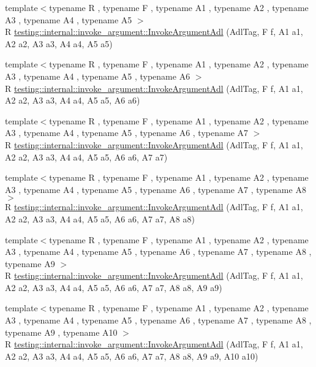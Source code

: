 \begin{DoxyCompactItemize}
\item 
{\footnotesize template$<$typename R , typename F , typename A1 , typename A2 , typename A3 , typename A4 , typename A5 $>$ }\\R \mbox{\hyperlink{namespacetesting_1_1internal_1_1invoke__argument_a371c08ae03d150520e8bda58fb4574c3}{testing\+::internal\+::invoke\+\_\+argument\+::\+Invoke\+Argument\+Adl}} (Adl\+Tag, F f, A1 a1, A2 a2, A3 a3, A4 a4, A5 a5)
\item 
{\footnotesize template$<$typename R , typename F , typename A1 , typename A2 , typename A3 , typename A4 , typename A5 , typename A6 $>$ }\\R \mbox{\hyperlink{namespacetesting_1_1internal_1_1invoke__argument_a16bf1b90d183210a82fbbef4e2eef1c5}{testing\+::internal\+::invoke\+\_\+argument\+::\+Invoke\+Argument\+Adl}} (Adl\+Tag, F f, A1 a1, A2 a2, A3 a3, A4 a4, A5 a5, A6 a6)
\item 
{\footnotesize template$<$typename R , typename F , typename A1 , typename A2 , typename A3 , typename A4 , typename A5 , typename A6 , typename A7 $>$ }\\R \mbox{\hyperlink{namespacetesting_1_1internal_1_1invoke__argument_a77f581ed8b270ed4752d49d5bdd59e84}{testing\+::internal\+::invoke\+\_\+argument\+::\+Invoke\+Argument\+Adl}} (Adl\+Tag, F f, A1 a1, A2 a2, A3 a3, A4 a4, A5 a5, A6 a6, A7 a7)
\item 
{\footnotesize template$<$typename R , typename F , typename A1 , typename A2 , typename A3 , typename A4 , typename A5 , typename A6 , typename A7 , typename A8 $>$ }\\R \mbox{\hyperlink{namespacetesting_1_1internal_1_1invoke__argument_a43c35b90896110940a0cc41c337ca306}{testing\+::internal\+::invoke\+\_\+argument\+::\+Invoke\+Argument\+Adl}} (Adl\+Tag, F f, A1 a1, A2 a2, A3 a3, A4 a4, A5 a5, A6 a6, A7 a7, A8 a8)
\item 
{\footnotesize template$<$typename R , typename F , typename A1 , typename A2 , typename A3 , typename A4 , typename A5 , typename A6 , typename A7 , typename A8 , typename A9 $>$ }\\R \mbox{\hyperlink{namespacetesting_1_1internal_1_1invoke__argument_a6e204965286414aac5113286eb5c8996}{testing\+::internal\+::invoke\+\_\+argument\+::\+Invoke\+Argument\+Adl}} (Adl\+Tag, F f, A1 a1, A2 a2, A3 a3, A4 a4, A5 a5, A6 a6, A7 a7, A8 a8, A9 a9)
\item 
{\footnotesize template$<$typename R , typename F , typename A1 , typename A2 , typename A3 , typename A4 , typename A5 , typename A6 , typename A7 , typename A8 , typename A9 , typename A10 $>$ }\\R \mbox{\hyperlink{namespacetesting_1_1internal_1_1invoke__argument_abd36164191a3e386c50243074854b272}{testing\+::internal\+::invoke\+\_\+argument\+::\+Invoke\+Argument\+Adl}} (Adl\+Tag, F f, A1 a1, A2 a2, A3 a3, A4 a4, A5 a5, A6 a6, A7 a7, A8 a8, A9 a9, A10 a10)

\end{DoxyCompactItemize}

